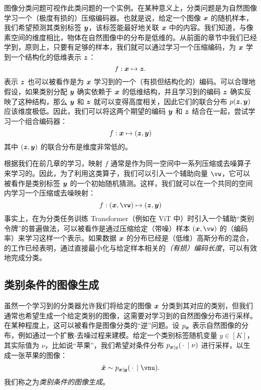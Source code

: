 \documentclass[../../book-main.tex]{subfiles}
\begin{document}
图像分类问题可视作此类问题的一个实例。在某种意义上，分类问题是为自然图像学习一个（极度有损的）压缩编码器。也就是说，给定一个图像 $\bm{x}$ 的随机样本，我们希望预测其类别标签 $\bm{y}$，该标签能最好地关联 $\bm{x}$ 中的内容。我们知道，与像素空间的维度相比，物体在自然图像中的分布是低维的。从前面的章节中我们已经学到，原则上，只要有足够的样本，我们就可以通过学习一个压缩编码，为 $\bm{x}$ 学到一个结构化的低维表示 $\bm{z}$：
\begin{equation}
    f: \bm{x} \mapsto \bm{z}. 
\end{equation}
表示 $\bm{z}$ 也可以被看作是为 $\bm{x}$ 学习到的一个（有损但结构化的）编码。可以合理地假设，如果类别分配 $\bm{y}$ 确实依赖于 $\bm{x}$ 的低维结构，并且学习到的编码 $\bm{z}$ 确实反映了这种结构，那么 $\bm{y}$ 和 $\bm{z}$ 就可以变得高度相关，因此它们的联合分布 $p(\bm{z}, \bm{y})$ 应该维度极低。因此，我们可以将这两个期望的编码 $\bm{y}$ 和 $\bm{z}$ 结合在一起，尝试学习一个组合编码器：
\begin{equation}
    f: \bm{x} \mapsto (\bm{z}, \bm{y}) 
\end{equation}
其中 $(\bm{z}, \bm{y})$ 的联合分布是维度非常低的。

根据我们在前几章的学习，映射 $f$ 通常是作为同一空间中一系列压缩或去噪算子来学习的。因此，为了利用这类算子，我们可以引入一个辅助向量 $\vw$，它可以被看作是类别标签 $\bm{y}$ 的一个初始随机猜测。这样，我们就可以在一个共同的空间内学习一个压缩或去噪映射：
\begin{equation}\label{eq:classifier-with-class-token}
    f: (\x, \vw) \mapsto (\z, \y)
\end{equation}
事实上，在为分类任务训练 Transformer（例如在 ViT 中）时引入一个辅助“类别令牌”的普遍做法，可以被看作是通过压缩给定（带噪）样本 $(\x, \vw)$ 的（编码率）来学习这样一个表示。如果数据 $\bm{x}$ 的分布已经是（低维）高斯分布的混合，\cite{wright2008classification} 的工作已经表明，通过直接最小化与给定样本相关的{\em（有损）编码长度}，可以有效地完成分类。


\subsection{类别条件的图像生成}\label{sub:cfg} 
虽然一个学习到的分类器允许我们将给定的图像 $\bm{x}$ 分类到其对应的类别，但我们通常也希望生成一个给定类别的图像，这需要对学习到的自然图像分布进行采样。在某种程度上，这可以被看作是图像分类的“逆”问题。设 $p_{\bm{x}}$ 表示自然图像的分布，例如通过一个扩散-去噪过程来建模。给定一个类别标签随机变量 $y \in [K]$，其实际值为 $\nu$，比如说“苹果”，我们希望对条件分布 $p_{\bm{x} \mid y}(\,\cdot\, \mid \nu)$ 进行采样，以生成一张苹果的图像：
\begin{equation}
  \hat{\x} \sim p_{\x\mid \y}(\,\cdot\, \mid \vnu).
\end{equation}
我们称之为{\em 类别条件的图像生成}。
\end{document}
